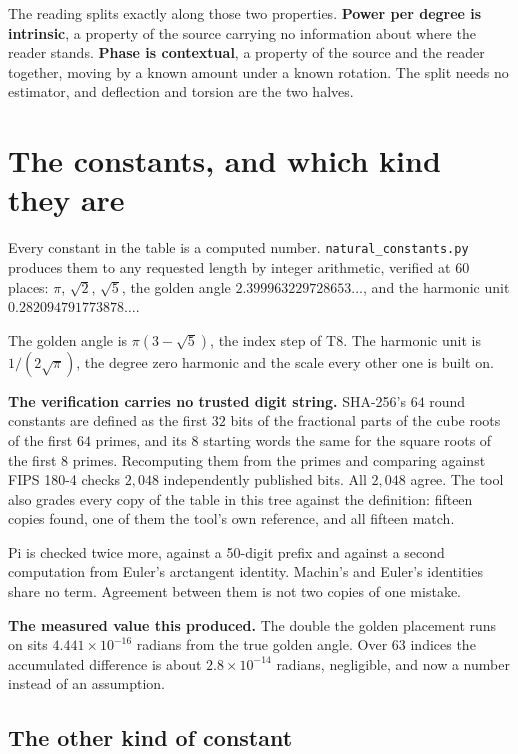 The reading splits exactly along those two properties. \textbf{Power per degree is intrinsic}, a property of the source carrying no information about where the reader stands. \textbf{Phase is contextual}, a property of the source and the reader together, moving by a known amount under a known rotation. The split needs no estimator, and deflection and torsion are the two halves.

\section{The constants, and which kind they are}

Every constant in the table is a computed number. \texttt{natural\_constants.py} produces them to any requested length by integer arithmetic, verified at \(60\) places: \(\pi\), \(\sqrt{2}\), \(\sqrt{5}\), the golden angle \(2.399963229728653\ldots\), and the harmonic unit \(0.282094791773878\ldots\).

The golden angle is \(\pi(3 - \sqrt{5})\), the index step of T8. The harmonic unit is \(1/(2\sqrt{\pi})\), the degree zero harmonic and the scale every other one is built on.

\textbf{The verification carries no trusted digit string.} SHA-256's \(64\) round constants are defined as the first \(32\) bits of the fractional parts of the cube roots of the first \(64\) primes, and its \(8\) starting words the same for the square roots of the first \(8\) primes. Recomputing them from the primes and comparing against FIPS 180-4 checks \(2{,}048\) independently published bits. All \(2{,}048\) agree. The tool also grades every copy of the table in this tree against the definition: fifteen copies found, one of them the tool's own reference, and all fifteen match.

Pi is checked twice more, against a 50-digit prefix and against a second computation from Euler's arctangent identity. Machin's and Euler's identities share no term. Agreement between them is not two copies of one mistake.

\textbf{The measured value this produced.} The double the golden placement runs on sits \(4.441 \times 10^{-16}\) radians from the true golden angle. Over \(63\) indices the accumulated difference is about \(2.8 \times 10^{-14}\) radians, negligible, and now a number instead of an assumption.

\subsection{The other kind of constant}

